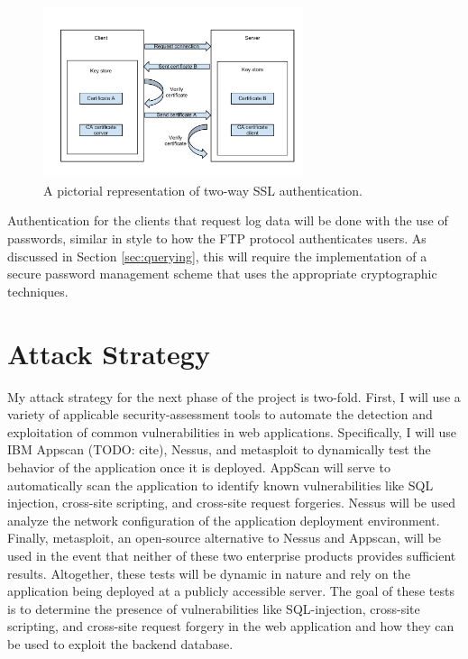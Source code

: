 \documentclass{sig-alternate}
\begin{document}
\begin{figure}[ht!]
\begin{center}
\includegraphics[width=3in]{images/two_way_ssl.pdf}
\caption{A pictorial representation of two-way SSL authentication. }
\label{fig:ssl}
\end{center}
\end{figure}

Authentication for the clients that request log data will be done with the use of passwords, similar in style to how the 
FTP protocol authenticates users. As discussed in Section \ref{sec:querying}, this will require the implementation of 
a secure password management scheme that uses the appropriate cryptographic techniques. 


\section{Attack Strategy}
\label{sec:attack}

My attack strategy for the next phase of the project is two-fold. First, I will use a variety of applicable security-assessment 
tools to automate the detection and exploitation of common vulnerabilities in web applications. 
Specifically, I will use IBM Appscan (TODO: cite), Nessus, and metasploit to dynamically test the behavior
of the application once it is deployed. AppScan will serve to automatically scan the application to identify
known vulnerabilities like SQL injection, cross-site scripting, and cross-site request forgeries. Nessus will be used
analyze the network configuration of the application deployment environment. Finally, metasploit, an open-source
alternative to Nessus and Appscan, will be used in the event that neither of these two enterprise products provides
sufficient results. Altogether, these tests will be dynamic in nature and rely on the application being deployed at a publicly
accessible server. The goal of these tests is to determine the presence of vulnerabilities like SQL-injection, cross-site
scripting, and cross-site request forgery in the web application and how they can be used to exploit the backend
database. 
\end{document}
